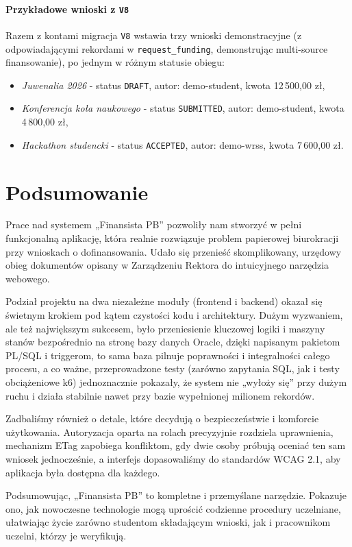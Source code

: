 \documentclass[12pt,a4paper]{article}
\begin{document}
\paragraph{Przykładowe wnioski z \texttt{V8}}
Razem z kontami migracja \texttt{V8} wstawia trzy wnioski demonstracyjne
(z odpowiadającymi rekordami w \texttt{request\_funding}, demonstrując
multi-source finansowanie),
po jednym w różnym statusie obiegu:
\begin{itemize}[leftmargin=*]
  \item \emph{Juwenalia 2026} - status \texttt{DRAFT}, autor: demo-student,
        kwota 12\,500{,}00 zł,
  \item \emph{Konferencja koła naukowego} - status \texttt{SUBMITTED},
        autor: demo-student, kwota 4\,800{,}00 zł,
  \item \emph{Hackathon studencki} - status \texttt{ACCEPTED},
        autor: demo-wrss, kwota 7\,600{,}00 zł.
\end{itemize}

\section{Podsumowanie}
\label{sec:podsumowanie}

Prace nad systemem „Finansista PB” pozwoliły nam stworzyć w pełni funkcjonalną aplikację, która realnie rozwiązuje problem papierowej biurokracji przy wnioskach o dofinansowania. Udało się przenieść skomplikowany, urzędowy obieg dokumentów opisany w Zarządzeniu Rektora do intuicyjnego narzędzia webowego.

Podział projektu na dwa niezależne moduły (frontend i backend) okazał się świetnym krokiem pod kątem czystości kodu i architektury. Dużym wyzwaniem, ale też największym sukcesem, było przeniesienie kluczowej logiki i maszyny stanów bezpośrednio na stronę bazy danych Oracle, dzięki napisanym pakietom PL/SQL i triggerom, to sama baza pilnuje poprawności i integralności całego procesu, a co ważne, przeprowadzone testy (zarówno zapytania SQL, jak i testy obciążeniowe k6) jednoznacznie pokazały, że system nie „wyłoży się” przy dużym ruchu i działa stabilnie nawet przy bazie wypełnionej milionem rekordów.

Zadbaliśmy również o detale, które decydują o bezpieczeństwie i komforcie użytkowania. Autoryzacja oparta na rolach precyzyjnie rozdziela uprawnienia, mechanizm ETag zapobiega konfliktom, gdy dwie osoby próbują oceniać ten sam wniosek jednocześnie, a interfejs dopasowaliśmy do standardów WCAG 2.1, aby aplikacja była dostępna dla każdego.

Podsumowując, „Finansista PB” to kompletne i przemyślane narzędzie. Pokazuje ono, jak nowoczesne technologie mogą uprościć codzienne procedury uczelniane, ułatwiając życie zarówno studentom składającym wnioski, jak i pracownikom uczelni, którzy je weryfikują.
\end{document}
